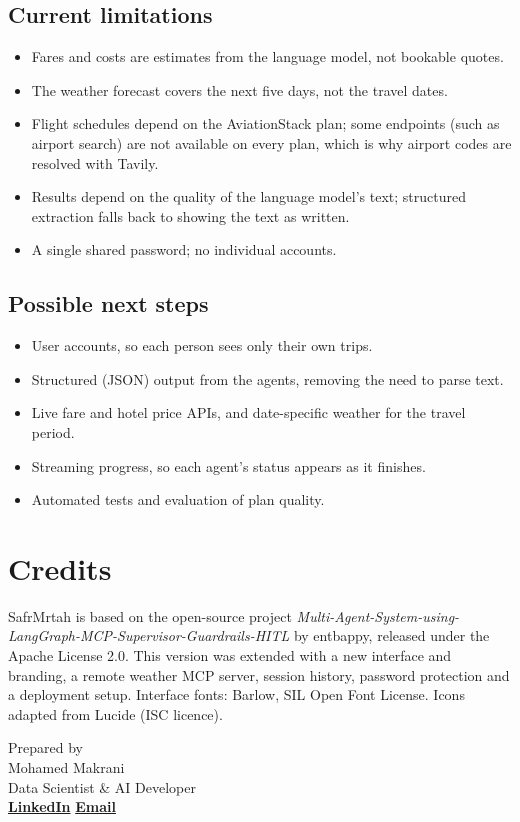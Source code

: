 \documentclass[11pt,a4paper]{article}
\makeatletter
\newcommand{\linkedinurl}{https://www.linkedin.com/in/mohamed-makrani-b9bb0028b/}
\newcommand{\emailaddr}{makranimohamed46@gmail.com}
\newcommand{\contactline}{%
  \href{\linkedinurl}{\color{accent}\bfseries LinkedIn}%
  \qquad
  \href{mailto:\emailaddr}{\color{accent}\bfseries Email}}
\makeatother
\begin{document}
\subsection{Current limitations}
\begin{itemize}
  \item Fares and costs are estimates from the language model, not bookable quotes.
  \item The weather forecast covers the next five days, not the travel dates.
  \item Flight schedules depend on the AviationStack plan; some endpoints (such as airport search) are not available on every plan, which is why airport codes are resolved with Tavily.
  \item Results depend on the quality of the language model's text; structured extraction falls back to showing the text as written.
  \item A single shared password; no individual accounts.
\end{itemize}

\subsection{Possible next steps}
\begin{itemize}
  \item User accounts, so each person sees only their own trips.
  \item Structured (JSON) output from the agents, removing the need to parse text.
  \item Live fare and hotel price APIs, and date-specific weather for the travel period.
  \item Streaming progress, so each agent's status appears as it finishes.
  \item Automated tests and evaluation of plan quality.
\end{itemize}

\clearpage
\section{Credits}
SafrMrtah is based on the open-source project \emph{Multi-Agent-System-using-LangGraph-MCP-Supervisor-Guardrails-HITL} by entbappy, released under the Apache License 2.0. This version was extended with a new interface and branding, a remote weather MCP server, session history, password protection and a deployment setup. Interface fonts: Barlow, SIL Open Font License. Icons adapted from Lucide (ISC licence).

\vspace{16mm}
\begin{center}
{\color{muted}\small Prepared by}\\[1mm]
{\heavy\large\color{slate}Mohamed Makrani}\\
{\color{accent}Data Scientist \& AI Developer}\\[2mm]
{\small\contactline}
\end{center}
\end{document}
